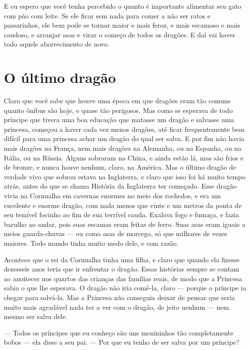 E eu espero que você tenha percebido o quanto é importante alimentar
seu gato com pão com leite. Se ele ficar sem nada para comer a não
ser ratos e passarinhos, ele bem pode se tornar maior e mais feroz, e
mais escamoso e mais caudoso, e arranjar asas e virar o começo de
todos os dragões. E daí vai haver todo aquele aborrecimento de novo.


\chapter{O último dragão}

Claro que você sabe que houve uma época em que dragões eram tão comuns
quanto ônibus são hoje, e quase tão perigosos. Mas como se esperava
de todo príncipe que tivera uma boa educação que matasse um dragão e
salvasse uma princesa, começou a haver cada vez menos dragões, até
ficar frequentemente bem difícil para uma princesa achar um dragão do
qual ser salva. E por fim não havia mais dragões na França, nem mais
dragões na Alemanha, ou na Espanha, ou na Itália, ou na Rússia.
Alguns sobraram na China, e ainda estão lá, mas são frios e de
bronze, e nunca houve nenhum, claro, na América. Mas o último dragão
de verdade vivo que sobrou estava na Inglaterra, e claro que isso foi
há muito tempo atrás, antes do que se chama História da Inglaterra
ter começado. Esse dragão vivia na Cornualha em cavernas enormes no
meio dos rochedos, e era um excelente e enorme dragão, com nada menos
que vinte e um metros da ponta de seu temível focinho ao fim de sua
terrível cauda. Exalava fogo e fumaça, e fazia barulho ao andar, pois
suas escamas eram feitas de ferro. Suas asas eram iguais a meios
guarda-chuvas — ou como asas de morcego, só que milhares de vezes
maiores. Todo mundo tinha muito medo dele, e com razão.

Acontece que o rei da Cornualha tinha uma filha, e claro que quando
ela fizesse dezesseis anos teria que ir enfrentar o dragão. Essas
histórias sempre se contam ao anoitecer nos quartos das crianças das
famílias reais, de modo que a Princesa sabia o que lhe esperava. O
dragão não iria comê-la, claro — porque o príncipe ia chegar para
salvá-la. Mas a Princesa não conseguia deixar de pensar que seria
muito mais agradável nada ter a ver com o dragão, de jeito nenhum —
nem mesmo ser salva dele.

— Todos os príncipes que eu conheço são uns menininhos tão
completamente bobos — ela disse a seu pai. — Por que eu tenho de ser
salva por um príncipe?

